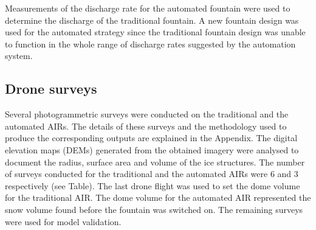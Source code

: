 \documentclass[tc, manuscript]{copernicus}
\begin{document}
Measurements of the discharge rate for the automated fountain were used to determine the discharge of the
traditional fountain. A new fountain design was used for the automated strategy since the traditional fountain
design was unable to function in the whole range of discharge rates suggested by the automation system.


\subsection{Drone surveys}

Several photogrammetric surveys were conducted on the traditional and the automated AIRs. The details of these
surveys and the methodology used to produce the corresponding outputs are explained in the Appendix. The digital
elevation maps (DEMs) generated from the obtained imagery were analysed to document the radius, surface area and
volume of the ice structures. The number of surveys conducted for the traditional and the automated AIRs were
6 and 3 respectively (see Table). The last drone flight was used to set the dome volume for the traditional AIR.
The dome volume for the automated AIR represented the snow volume found before the fountain was switched on. The
remaining surveys were used for model validation.
\end{document}
